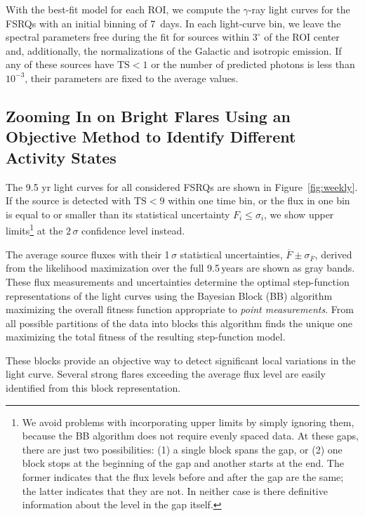 \documentclass[twocolumn]{aastex62}
\newcommand{\gray}{$\gamma$-ray\xspace}
\begin{document}
With the best-fit model for each ROI, we compute the \gray light curves for the FSRQs with an initial binning of 7~days. 
In each light-curve bin, we leave the spectral parameters free during the fit for sources within $3^\circ$ of the ROI center and, additionally, the normalizations of the Galactic and isotropic emission. If any of these sources have $\mathrm{TS} < 1$ or the number of predicted photons is less than $10^{-3}$, their parameters are fixed to the average values.

\subsection{Zooming In on Bright Flares Using an Objective Method to Identify Different Activity States}
\label{sec:zoom}

The 9.5 yr light curves for all considered FSRQs are shown in Figure~\ref{fig:weekly}. If the source is detected with $\mathrm{TS} < 9$ within one time bin, or the flux in one bin is equal to or smaller than its statistical uncertainty $F_i \leqslant \sigma_i$, we show upper limits\footnote{We avoid 
problems with incorporating upper limits by simply ignoring them, because the BB algorithm does not require evenly spaced data. At these gaps, there
are just two possibilities:
(1) a single block spans the gap,
or 
(2) one block stops at the beginning of
the gap and another starts at the end.
The former indicates that the flux levels
before and after the gap are the same;
the latter indicates that they are not.
In neither case is there definitive 
information about the level in the
gap itself.}
at the $2\,\sigma$ confidence level instead.

The average source fluxes with their 1$\,\sigma$ statistical uncertainties, $\overline{F} \pm \sigma_{\overline{F}}$, derived from the likelihood maximization over the full 9.5\,years are shown as gray bands. 
These flux measurements and uncertainties determine the optimal step-function representations of the light curves %
using the Bayesian Block (BB) 
algorithm ~\citep[][]{2013ApJ...764..167S} maximizing the overall fitness function appropriate to \textit{point measurements}.
From all possible partitions of the data into blocks this algorithm finds the unique one maximizing the total fitness of the resulting step-function model.


These blocks provide an objective way to detect significant local variations in the light curve.
Several strong flares exceeding the average flux level are easily identified from this block representation. 
\end{document}
